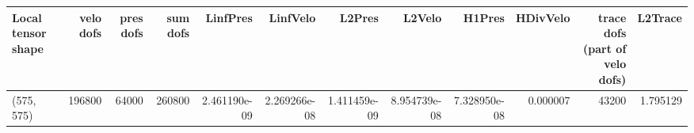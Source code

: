 \begin{tabular}{lrrrrrrrrrrr}
\toprule
Local tensor shape &  velo dofs &  pres dofs &  sum dofs &     LinfPres &     LinfVelo &       L2Pres &       L2Velo &       H1Pres &  HDivVelo &  trace dofs (part of velo dofs) &  L2Trace \\
\midrule
        (575, 575) &     196800 &      64000 &    260800 & 2.461190e-09 & 2.269266e-08 & 1.411459e-09 & 8.954739e-08 & 7.328950e-08 &  0.000007 &                           43200 & 1.795129 \\
\bottomrule
\end{tabular}
